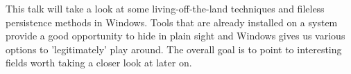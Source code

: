 \def\abstracttitle{Hidden in plain sight}
\def\abstractcomment{Regular Talk}
\def\abstractowner{Essy}

\thispagestyle{abstract}

This talk will take a look at some living-off-the-land techniques and fileless persistence methods in Windows. Tools that are already installed on a system provide a good opportunity to hide in plain sight and Windows gives us various options to 'legitimately' play around.
The overall goal is to point to interesting fields worth taking a closer look at later on.
